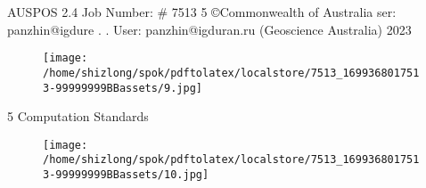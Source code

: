 \documentclass[a4paper,12pt]{article}
\begin{document}
\vspace{10pt}

         AUSPOS 2.4 Job Number: \# 7513 5 ©Commonwealth of Australia    ser: panzhin@igdure . .  User: panzhin@igduran.ru (Geoscience Australia) 2023 

\vspace{10pt}

\par

\vspace{10pt}

\begin{figure}[h]

\texttt{[image: /home/shizlong/spok/pdftolatex/localstore/7513\_1699368017513-99999999BBassets/9.jpg]}

\centering

\end{figure}

    5 Computation Standards 

\vspace{10pt}

\begin{figure}[h]

\texttt{[image: /home/shizlong/spok/pdftolatex/localstore/7513\_1699368017513-99999999BBassets/10.jpg]}

\centering

\end{figure}
\end{document}
